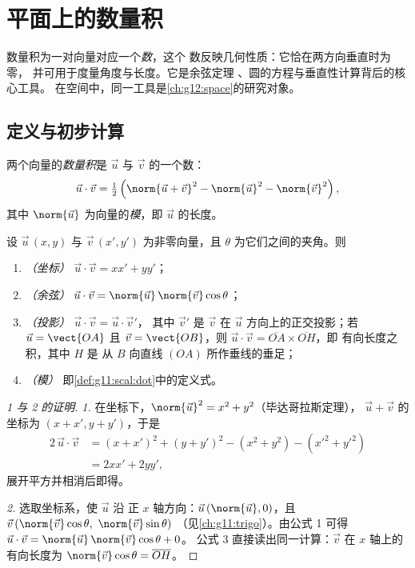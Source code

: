 \chapter{平面上的数量积}\label{ch:g11:scal}

数量积为一对向量对应一个\emph{数}，这个
数反映几何性质：它恰在两方向垂直时为零，
并可用于度量角度与长度。它是余弦定理
、圆的方程与垂直性计算背后的核心工具。
在空间中，同一工具是\cref{ch:g12:space}的研究对象。

\section{定义与初步计算}

\begin{definition}[数量积]\label{def:g11:scal:dot}
两个向量的\emph{数量积}是
$\vec u$ 与 $\vec v$ 的一个数：
\[
\vec u \cdot \vec v
= \tfrac12\left(\norm{\vec u + \vec v}^2 - \norm{\vec u}^2
- \norm{\vec v}^2\right),
\]
其中 $\norm{\vec u}$ 为向量的\emph{模}，即 $\vec u$ 的长度。
\end{definition}

\begin{theorem}[数量积的四种表示]\label{thm:g11:scal:faces}
设 $\vec u\,(x, y)$ 与 $\vec v\,(x', y')$ 为非零向量，且
$\theta$ 为它们之间的夹角。则
\begin{enumerate}
  \item \emph{（坐标）} $\vec u \cdot \vec v = xx' + yy'$；
  \item \emph{（余弦）} $\vec u \cdot \vec v =
        \norm{\vec u}\,\norm{\vec v}\cos\theta$；
  \item \emph{（投影）} $\vec u \cdot \vec v = \vec u \cdot \vec v'$，
        其中 $\vec v'$ 是 $\vec v$ 在
        $\vec u$ 方向上的正交投影；若 $\vec u = \vect{OA}$ 且
        $\vec v = \vect{OB}$，则
        $\vec u \cdot \vec v = \overline{OA} \times \overline{OH}$，即
        有向长度之积，其中 $H$ 是
        从 $B$ 向直线 $(OA)$ 所作垂线的垂足；
  \item \emph{（模）} 即\cref{def:g11:scal:dot}中的定义式。
\end{enumerate}
\end{theorem}

\begin{proof}[1 与 2 的证明]
\emph{1.} 在坐标下，$\norm{\vec u}^2 = x^2 + y^2$（毕达哥拉斯定理），
$\vec u + \vec v$ 的坐标为 $(x + x', y + y')$，于是
\begin{align*}
2\,\vec u \cdot \vec v
&= (x + x')^2 + (y + y')^2 - (x^2 + y^2) - (x'^2 + y'^2)\\
&= 2xx' + 2yy',
\end{align*}
展开平方并相消后即得。

\emph{2.} 选取坐标系，使 $\vec u$ 沿
正 $x$ 轴方向：$\vec u\,(\norm{\vec u}, 0)$，且
$\vec v\,(\norm{\vec v}\cos\theta,\ \norm{\vec v}\sin\theta)$
（见\cref{ch:g11:trigo}）。由公式 1 可得
$\vec u \cdot \vec v = \norm{\vec u}\,\norm{\vec v}\cos\theta + 0$。
公式 3 直接读出同一计算：$\vec v$ 在
$x$ 轴上的有向长度为 $\norm{\vec v}\cos\theta =
\overline{OH}$。
\end{proof}

